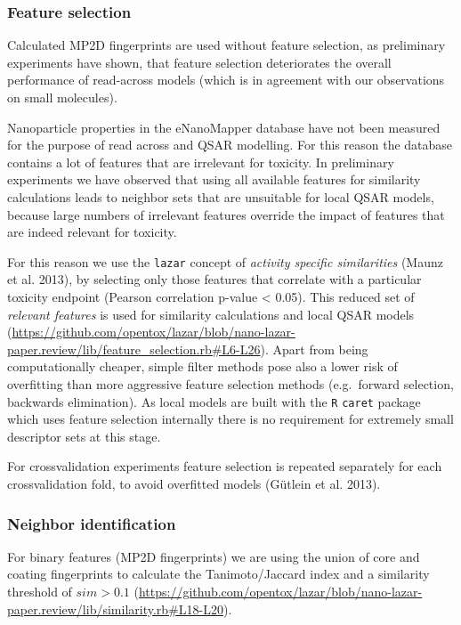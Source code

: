 \documentclass[utf8]{frontiersHLTH} %
\begin{document}
\subsubsection{Feature selection}\label{feature-selection}

Calculated MP2D fingerprints are used without feature selection, as
preliminary experiments have shown, that feature selection deteriorates
the overall performance of read-across models (which is in agreement
with our observations on small molecules).

Nanoparticle properties in the eNanoMapper database have not been
measured for the purpose of read across and QSAR modelling. For this
reason the database contains a lot of features that are irrelevant for
toxicity. In preliminary experiments we have observed that using all
available features for similarity calculations leads to neighbor sets
that are unsuitable for local QSAR models, because large numbers of
irrelevant features override the impact of features that are indeed
relevant for toxicity.

For this reason we use the \texttt{lazar} concept of \emph{activity
specific similarities} (Maunz et al. 2013), by selecting only those
features that correlate with a particular toxicity endpoint (Pearson
correlation p-value \textless{} 0.05). This reduced set of
\emph{relevant features} is used for similarity calculations and local
QSAR models
(\url{https://github.com/opentox/lazar/blob/nano-lazar-paper.review/lib/feature_selection.rb\#L6-L26}).
Apart from being computationally cheaper, simple filter methods pose
also a lower risk of overfitting than more aggressive feature selection
methods (e.g.~forward selection, backwards elimination). As local models
are built with the \texttt{R} \texttt{caret} package which uses feature
selection internally there is no requirement for extremely small
descriptor sets at this stage.

For crossvalidation experiments feature selection is repeated separately
for each crossvalidation fold, to avoid overfitted models (Gütlein et
al. 2013).

\subsubsection{Neighbor identification}\label{neighbor-identification}

For binary features (MP2D fingerprints) we are using the union of core
and coating fingerprints to calculate the Tanimoto/Jaccard index and a
similarity threshold of \(sim > 0.1\)
(\url{https://github.com/opentox/lazar/blob/nano-lazar-paper.review/lib/similarity.rb\#L18-L20}).
\end{document}
